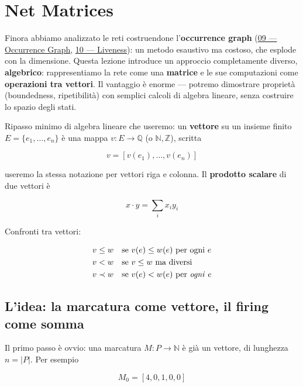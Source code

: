 \chapter{\texorpdfstring{Net Matrices}{Net Matrices}}
\label{ch:11}

Finora abbiamo analizzato le reti costruendone l'\textbf{occurrence graph} (\hyperref[ch:09]{09 — Occurrence Graph}, \hyperref[ch:10]{10 — Liveness}): un metodo esaustivo ma costoso, che esplode con la dimensione. Questa lezione introduce un approccio completamente diverso, \textbf{algebrico}: rappresentiamo la rete come una \textbf{matrice} e le sue computazioni come \textbf{operazioni tra vettori}. Il vantaggio è enorme — potremo dimostrare proprietà (boundedness, ripetibilità) con semplici calcoli di algebra lineare, senza costruire lo spazio degli stati.

Ripasso minimo di algebra lineare che useremo: un \textbf{vettore} su un insieme finito $E = \{e_1, \dots, e_n\}$ è una mappa $v : E \to \mathbb{Q}$ (o $\mathbb{N}, \mathbb{Z}$), scritta

\[
v = [v(e_1), \dots, v(e_n)]
\]

useremo la stessa notazione per vettori riga e colonna. Il \textbf{prodotto scalare} di due vettori è

\[
x \cdot y = \sum_i x_i y_i
\]

Confronti tra vettori:

\[
\begin{aligned}
v \le w &\quad \text{se } v(e) \le w(e) \text{ per ogni } e \\
v < w &\quad \text{se } v \le w \text{ ma diversi} \\
v \prec w &\quad \text{se } v(e) < w(e) \text{ per \textit{ogni} } e
\end{aligned}
\]

\section{\texorpdfstring{L'idea: la marcatura come vettore, il firing come somma}{L'idea: la marcatura come vettore, il firing come somma}}

Il primo passo è ovvio: una marcatura $M : P \to \mathbb{N}$ è già un vettore, di lunghezza $n = |P|$. Per esempio

\[
M_0 = [4, 0, 1, 0, 0]
\]

